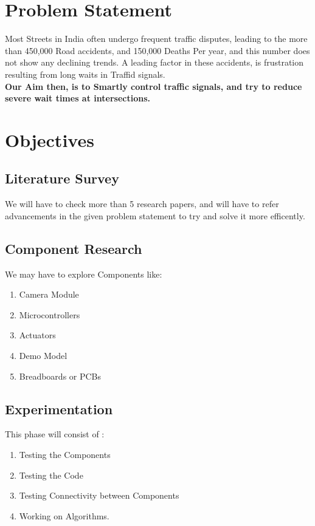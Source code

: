 \documentclass[11pt]{article}
\begin{document}
\tableofcontents
\thispagestyle{empty}
\clearpage

\setcounter{page}{1}

\section{Problem Statement}
Most Streets in India often undergo frequent traffic disputes, leading to the more than 450,000 Road accidents, and 150,000 Deaths Per year, and this number does not show any declining trends. A leading factor in these accidents, is frustration resulting from long waits in Traffid signals. \\

\textbf{Our Aim then, is to Smartly control traffic signals, and try to reduce severe wait times at intersections.}

\section{Objectives}
\subsection{Literature Survey}
We will have to check more than 5 research papers, and will have to refer advancements in the given problem statement to try and solve it more efficently.
\subsection{Component Research}
We may have to explore Components like:
\begin{enumerate}
	\item Camera Module
	\item Microcontrollers
	\item Actuators
	\item Demo Model
	\item Breadboards or PCBs
\end{enumerate}

\subsection{Experimentation}
This phase will consist of :
\begin{enumerate}
	\item Testing the Components
	\item Testing the Code
	\item Testing Connectivity between Components
	\item Working on Algorithms.
\end{enumerate}
\end{document}
